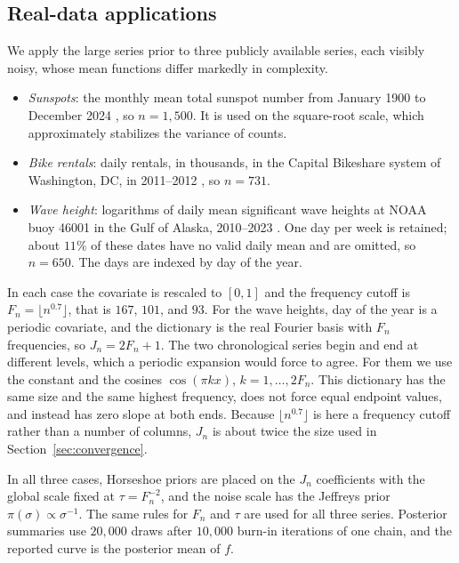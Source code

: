 \subsection{Real-data applications}
\label{sec:applications}

We apply the large series prior to three publicly available series, each visibly noisy, whose mean functions differ markedly in complexity.
\begin{itemize}
\item \emph{Sunspots}: the monthly mean total sunspot number from January 1900 to December 2024 \citep{SILSO,Clette2014}, so $n=1{,}500$. It is used on the square-root scale, which approximately stabilizes the variance of counts.
\item \emph{Bike rentals}: daily rentals, in thousands, in the Capital Bikeshare system of Washington, DC, in 2011--2012 \citep{FanaeeT2014,UCIBike}, so $n=731$.
\item \emph{Wave height}: logarithms of daily mean significant wave heights at NOAA buoy 46001 in the Gulf of Alaska, 2010--2023 \citep{NDBC46001}. One day per week is retained; about $11\%$ of these dates have no valid daily mean and are omitted, so $n=650$. The days are indexed by day of the year.
\end{itemize}

In each case the covariate is rescaled to $[0,1]$ and the frequency cutoff is $F_n=\lfloor n^{0.7}\rfloor$, that is $167$, $101$, and $93$. For the wave heights, day of the year is a periodic covariate, and the dictionary is the real Fourier basis with $F_n$ frequencies, so $J_n=2F_n+1$. The two chronological series begin and end at different levels, which a periodic expansion would force to agree. For them we use the constant and the cosines $\cos(\pi kx)$, $k=1,\ldots,2F_n$. This dictionary has the same size and the same highest frequency, does not force equal endpoint values, and instead has zero slope at both ends. Because $\lfloor n^{0.7}\rfloor$ is here a frequency cutoff rather than a number of columns, $J_n$ is about twice the size used in Section~\ref{sec:convergence}.

In all three cases, Horseshoe priors are placed on the $J_n$ coefficients with the global scale fixed at $\tau=F_n^{-2}$, and the noise scale has the Jeffreys prior $\pi(\sigma)\propto\sigma^{-1}$. The same rules for $F_n$ and $\tau$ are used for all three series. Posterior summaries use $20{,}000$ draws after $10{,}000$ burn-in iterations of one chain, and the reported curve is the posterior mean of $f$.

